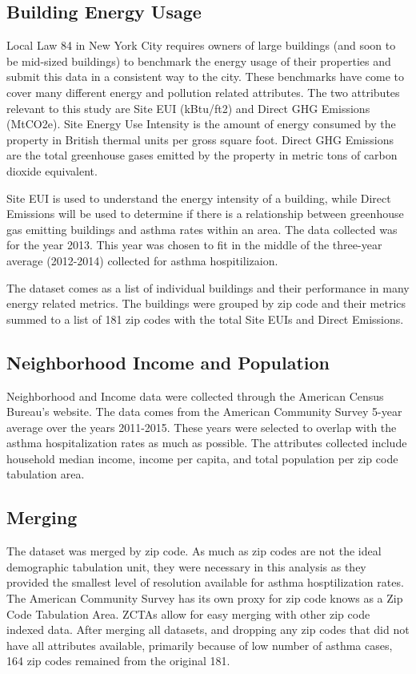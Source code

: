 \documentclass[conference]{IEEEtran}
\begin{document}
\subsection{Building Energy Usage}
Local Law 84 in New York City requires owners of large buildings (and soon to be mid-sized
buildings) to benchmark the energy usage of their properties and submit this data
in a consistent way to the city. These benchmarks have come to cover many different
energy and pollution related attributes. The two attributes relevant to this study are
Site EUI (kBtu/ft2) and Direct GHG Emissions (MtCO2e). Site Energy Use Intensity is the
amount of energy consumed by the property in British thermal units per gross square foot.
Direct GHG Emissions are the total greenhouse gases emitted by the property in metric
tons of carbon dioxide equivalent.

Site EUI is used to understand the energy intensity of a building, while Direct Emissions
will be used to determine if there is a relationship between greenhouse gas emitting
buildings and asthma rates within an area. The data collected was for the year 2013.
This year was chosen to fit in the middle of the three-year average (2012-2014) collected for
asthma hospitilizaion.

The dataset comes as a list of individual buildings and their performance in many energy
related metrics. The buildings were grouped by zip code and their metrics summed to a list
of 181 zip codes with the total Site EUIs and Direct Emissions.

\subsection{Neighborhood Income and Population}
Neighborhood and Income data were collected through the American Census Bureau's website.
The data comes from the American Community Survey 5-year average over the years 2011-2015.
These years were selected to overlap with the asthma hospitalization rates as much as possible.
The attributes collected include household median income, income per capita, and total
population per zip code tabulation area.

\subsection{Merging}
The dataset was merged by zip code. As much as zip codes are not the ideal demographic
tabulation unit, they were necessary in this analysis as they provided the smallest level
of resolution available for asthma hosptilization rates. The American Community Survey
has its own proxy for zip code knows as a Zip Code Tabulation Area. ZCTAs allow for easy
merging with other zip code indexed data. After merging all datasets, and dropping
any zip codes that did not have all attributes available, primarily because of low number
of asthma cases, 164 zip codes remained from the original 181.
\end{document}
